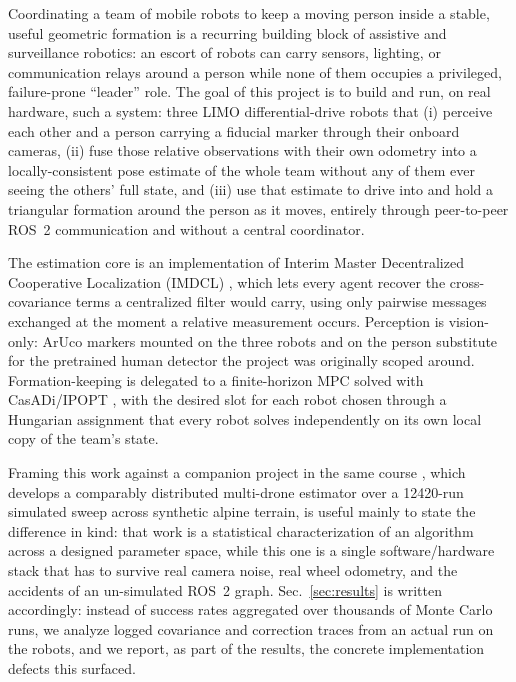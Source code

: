 \documentclass[10pt,conference]{IEEEtran}
\begin{document}
Coordinating a team of mobile robots to keep a moving person inside a stable, useful geometric
formation is a recurring building block of assistive and surveillance robotics: an escort of
robots can carry sensors, lighting, or communication relays around a person while none of them
occupies a privileged, failure-prone ``leader'' role. The goal of this project is to build and
run, on real hardware, such a system: three LIMO differential-drive robots that (i) perceive each
other and a person carrying a fiducial marker through their onboard cameras, (ii) fuse those
relative observations with their own odometry into a locally-consistent pose estimate of the
whole team without any of them ever seeing the others' full state, and (iii) use that estimate to
drive into and hold a triangular formation around the person as it moves, entirely through
peer-to-peer ROS~2 communication and without a central coordinator.

The estimation core is an implementation of Interim Master Decentralized Cooperative Localization
(IMDCL) \cite{kia2016}, which lets every agent recover the cross-covariance terms a centralized
filter would carry, using only pairwise messages exchanged at the moment a relative measurement
occurs. Perception is vision-only: ArUco markers \cite{aruco2014} mounted on the three robots and
on the person substitute for the pretrained human detector the project was originally scoped
around. Formation-keeping is delegated to a finite-horizon MPC solved with CasADi/IPOPT
\cite{casadi2019,wachter2006}, with the desired slot for each robot chosen through a Hungarian
assignment \cite{kuhn1955} that every robot solves independently on its own local copy of the
team's state.

Framing this work against a companion project in the same course
\cite{renelli-zanolini-artva}, which develops a comparably distributed multi-drone estimator over
a 12420-run simulated sweep across synthetic alpine terrain, is useful mainly to state the
difference in kind: that work is a statistical characterization of an algorithm across a designed
parameter space, while this one is a single software/hardware stack that has to survive real
camera noise, real wheel odometry, and the accidents of an un-simulated ROS~2 graph.
Sec.~\ref{sec:results} is written accordingly: instead of success rates aggregated over thousands
of Monte Carlo runs, we
analyze logged covariance and correction traces from an actual run on the robots, and we report,
as part of the results, the concrete implementation defects this surfaced.
\end{document}
